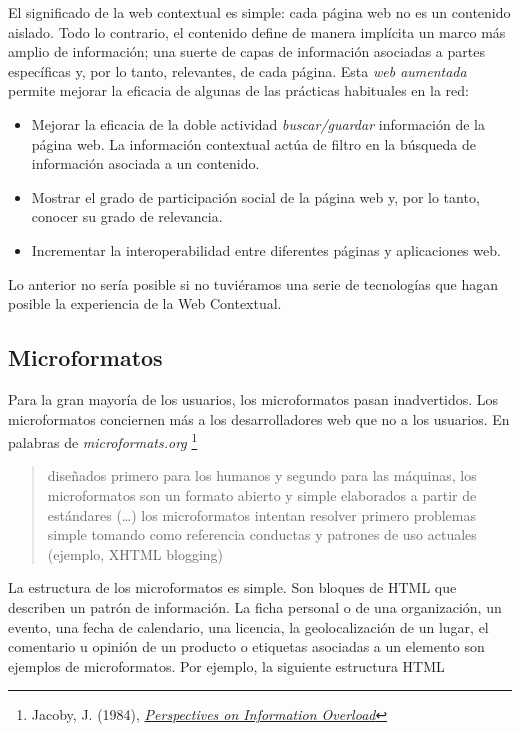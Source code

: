 \documentclass[12pt, a4paper,twoside]{book}
\begin{document}
El significado de la web contextual es simple: cada página web no
es un contenido aislado. Todo lo contrario, el contenido define de
manera implícita un marco más amplio de información; una suerte de
capas de información asociadas a partes específicas y, por lo
tanto, relevantes, de cada página. Esta \emph{web aumentada}
permite mejorar la eficacia de algunas de las prácticas habituales
en la red:

\begin{itemize}
\item
  Mejorar la eficacia de la doble actividad \emph{buscar/guardar}
  información de la página web. La información contextual actúa de
  filtro en la búsqueda de información asociada a un contenido.
\item
  Mostrar el grado de participación social de la página web y, por lo
  tanto, conocer su grado de relevancia.
\item
  Incrementar la interoperabilidad entre diferentes páginas y
  aplicaciones web.
\end{itemize}
Lo anterior no sería posible si no tuviéramos una serie de
tecnologías que hagan posible la experiencia de la Web Contextual.

\subsection{Microformatos}

Para la gran mayoría de los usuarios, los microformatos pasan
inadvertidos. Los microformatos conciernen más a los
desarrolladores web que no a los usuarios. En palabras de
\emph{microformats.org}%
\footnote{Jacoby, J. (1984),
\emph{\href{http://www.jstor.org/pss/2488912}{Perspectives on Information Overload}}}

\begin{quote}
diseñados primero para los humanos y segundo para las máquinas, los
microformatos son un formato abierto y simple elaborados a partir
de estándares (\ldots{}) los microformatos intentan resolver
primero problemas simple tomando como referencia conductas y
patrones de uso actuales (ejemplo, XHTML blogging)

\end{quote}
La estructura de los microformatos es simple. Son bloques de HTML
que describen un patrón de información. La ficha personal o de una
organización, un evento, una fecha de calendario, una licencia, la
geolocalización de un lugar, el comentario u opinión de un producto
o etiquetas asociadas a un elemento son ejemplos de microformatos.
Por ejemplo, la siguiente estructura HTML
\end{document}
